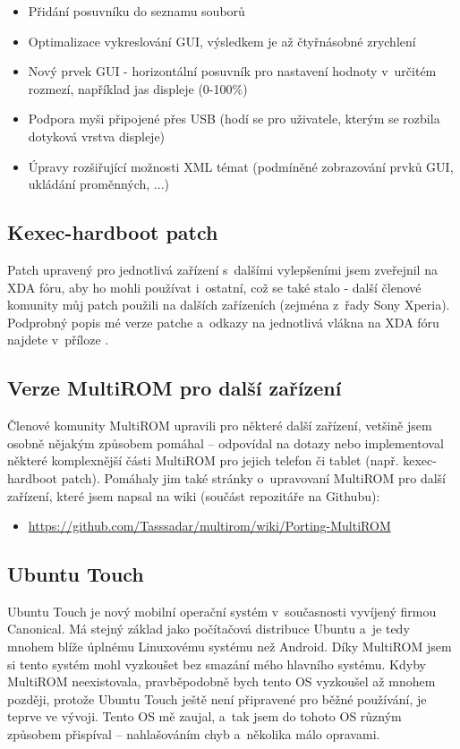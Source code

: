 \documentclass[12pt, a4paper, oneside]{article}
\begin{document}
\begin{itemize}
    \item Přidání posuvníku do seznamu souborů
    \item Optimalizace vykreslování GUI, výsledkem je až čtyřnásobné zrychlení
    \item Nový prvek GUI - horizontální posuvník pro nastavení hodnoty v~určitém rozmezí, například jas displeje (0-100\%)
    \item Podpora myši připojené přes USB (hodí se pro uživatele, kterým se rozbila dotyková vrstva displeje)
    \item Úpravy rozšiřující možnosti XML témat (podmíněné zobrazování prvků GUI, ukládání proměnných, ...)
\end{itemize}

\subsection{Kexec-hardboot patch}
Patch upravený pro jednotlivá zařízení s~dalšími vylepšeními jsem zveřejnil na XDA fóru, aby ho mohli používat i~ostatní, což se také stalo - další členové komunity můj patch použili na dalších zařízeních (zejména z~řady Sony Xperia). Podprobný popis mé verze patche a~odkazy na jednotlivá vlákna na XDA fóru najdete v~příloze .

\subsection{Verze MultiROM pro další zařízení}
Členové komunity MultiROM upravili pro některé další zařízení, vetšině jsem osobně nějakým způsobem pomáhal -- odpovídal na dotazy nebo implementoval některé komplexnější části MultiROM pro jejich telefon či tablet (např. kexec-hardboot patch). Pomáhaly jim také stránky o~upravovaní MultiROM pro další zařízení, které jsem napsal na wiki (součást repozitáře na Githubu):

\begin{itemize}
    \item \url{https://github.com/Tasssadar/multirom/wiki/Porting-MultiROM}
\end{itemize}

\subsection{Ubuntu Touch}
Ubuntu Touch\cite{utouch} je nový mobilní operační systém v~současnosti vyvíjený firmou Canonical. Má stejný základ jako počítačová distribuce Ubuntu a~je tedy mnohem blíže úplnému Linuxovému systému než Android. Díky MultiROM jsem si tento systém mohl vyzkoušet bez smazání mého hlavního systému. Kdyby MultiROM neexistovala, pravběpodobně bych tento OS vyzkoušel až mnohem později, protože Ubuntu Touch ještě není připravené pro běžné používání, je teprve ve vývoji. Tento OS mě zaujal, a~tak jsem do tohoto OS různým způsobem přispíval -- nahlašováním chyb a~několika málo opravami.
\end{document}
